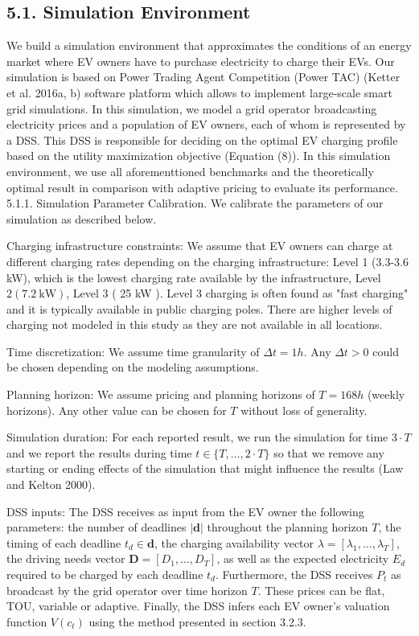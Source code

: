 \documentclass[10pt]{article}
\begin{document}
\subsection*{5.1. Simulation Environment}
We build a simulation environment that approximates the conditions of an energy market where EV owners have to purchase electricity to charge their EVs. Our simulation is based on Power Trading Agent Competition (Power TAC) (Ketter et al. 2016a, b) software platform which allows to implement large-scale smart grid simulations. In this simulation, we model a grid operator broadcasting electricity prices and a population of EV owners, each of whom is represented by a DSS. This DSS is responsible for deciding on the optimal EV charging profile based on the utility maximization objective (Equation (8)). In this simulation environment, we use all aforementtioned benchmarks and the theoretically optimal result in comparison with adaptive pricing to evaluate its performance.\\
5.1.1. Simulation Parameter Calibration. We calibrate the parameters of our simulation as described below.

Charging infrastructure constraints: We assume that EV owners can charge at different charging rates depending on the charging infrastructure: Level 1 (3.3-3.6 kW), which is the lowest charging rate available by the infrastructure, Level $2(7.2 \mathrm{~kW})$, Level 3 ( 25 kW ). Level 3 charging is often found as "fast charging" and it is typically available in public charging poles. There are higher levels of charging not modeled in this study as they are not available in all locations.

Time discretization: We assume time granularity of $\Delta t=1 h$. Any $\Delta t>0$ could be chosen depending on the modeling assumptions.

Planning horizon: We assume pricing and planning horizons of $T=168 h$ (weekly horizons). Any other value can be chosen for $T$ without loss of generality.

Simulation duration: For each reported result, we run the simulation for time $3 \cdot T$ and we report the results during time $t \in\{T, \ldots, 2 \cdot T\}$ so that we remove any starting or ending effects of the simulation that might influence the results (Law and Kelton 2000).

DSS inputs: The DSS receives as input from the EV owner the following parameters: the number of deadlines $|\mathbf{d}|$ throughout the planning horizon $T$, the timing of each deadline $t_{d} \in \mathbf{d}$, the charging availability vector $\lambda=\left[\lambda_{1}, \ldots, \lambda_{T}\right]$, the driving needs vector $\mathbf{D}=\left[D_{1}, \ldots, D_{T}\right]$, as well as the expected electricity $E_{d}$\\
required to be charged by each deadline $t_{d}$. Furthermore, the DSS receives $P_{t}$ as broadcast by the grid operator over time horizon $T$. These prices can be flat, TOU, variable or adaptive. Finally, the DSS infers each EV owner's valuation function $V\left(c_{t}\right)$ using the method presented in section 3.2.3.
\end{document}
